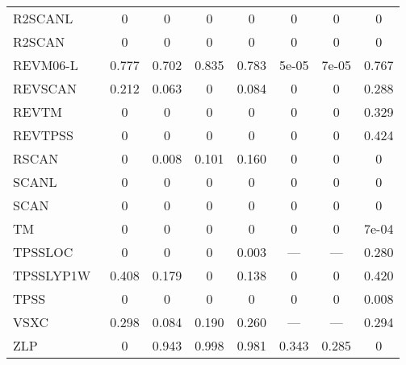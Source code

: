 \begin{table*}
\begin{tabular}{|l|c|c|c|c|c|c|c|}
R2SCANL~\cite{Mejia2020_121109,Furness2020_8208,Furness2020_9248} & 0 & 0 & 0 & 0 & 0 & 0 & 0 \\
R2SCAN~\cite{Furness2020_8208,Furness2020_9248} & 0 & 0 & 0 & 0 & 0 & 0 & 0 \\
REVM06-L~\cite{Wang2017_8487} & 0.777 & 0.702 & 0.835 & 0.783 & 5e-05 & 7e-05 & 0.767 \\
REVSCAN~\cite{Mezei2018_2469} & 0.212 & 0.063 & 0 & 0.084 & 0 & 0 & 0.288 \\
REVTM~\cite{Jana2019_6356} & 0 & 0 & 0 & 0 & 0 & 0 & 0.329 \\
REVTPSS~\cite{Perdew2009_026403,Perdew2011_179902} & 0 & 0 & 0 & 0 & 0 & 0 & 0.424 \\
RSCAN~\cite{Bartok2019_161101} & 0 & 0.008 & 0.101 & 0.160 & 0 & 0 & 0 \\
SCANL~\cite{Mejia2017_052512,Mejia2018_115161,Sun2015_036402} & 0 & 0 & 0 & 0 & 0 & 0 & 0 \\
SCAN~\cite{Sun2015_036402} & 0 & 0 & 0 & 0 & 0 & 0 & 0 \\
TM~\cite{Tao2016_073001} & 0 & 0 & 0 & 0 & 0 & 0 & 7e-04 \\
TPSSLOC~\cite{Constantin2012_035130} & 0 & 0 & 0 & 0.003 & --- & --- & 0.280 \\
TPSSLYP1W~\cite{Dahlke2005_15677} & 0.408 & 0.179 & 0 & 0.138 & 0 & 0 & 0.420 \\
TPSS~\cite{Tao2003_146401,Perdew2004_6898} & 0 & 0 & 0 & 0 & 0 & 0 & 0.008 \\
VSXC~\cite{VanVoorhis1998_400} & 0.298 & 0.084 & 0.190 & 0.260 & --- & --- & 0.294 \\
ZLP~\cite{Zhao1993_918} & 0 & 0.943 & 0.998 & 0.981 & 0.343 & 0.285 & 0 \\
\bottomrule
\end{tabular}
\end{table*}
